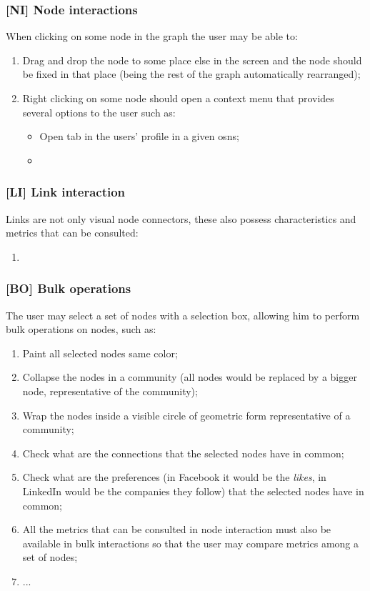 \subsubsection*{\textbf{[NI] Node interactions}}
When clicking on some node in the graph the user may be able to:
\begin{enumerate}
    \item Drag and drop the node to some place else in the screen and the node should be fixed in that place (being the rest of the graph
    automatically rearranged);
    \item Right clicking on some node should open a context menu that provides several options to the user such as:
    \begin{itemize}
        \item Open tab in the users' profile in a given \glspl{osn};
        \item
    \end{itemize}
\end{enumerate}

\subsubsection*{\textbf{[LI] Link interaction}}
Links are not only visual node connectors, these also possess characteristics and metrics that can be consulted:
\begin{enumerate}
    \item
\end{enumerate}

\subsubsection*{\textbf{[BO] Bulk operations}}
The user may select a set of nodes with a selection box, allowing him to perform bulk operations on nodes, such as:
\begin{enumerate}
    \item Paint all selected nodes same color;
    \item Collapse the nodes in a community (all nodes would be replaced by a bigger node, representative of the community);
    \item Wrap the nodes inside a visible circle of geometric form representative of a community;
    \item Check what are the connections that the selected nodes have in common;
    \item Check what are the preferences (in Facebook it would be the \textit{likes}, in LinkedIn would be the companies they follow) that the selected nodes have in common;
    \item All the metrics that can be consulted in node interaction must also be available in bulk interactions so that the user may compare metrics among a set of
    nodes;
    \item ...
\end{enumerate}

